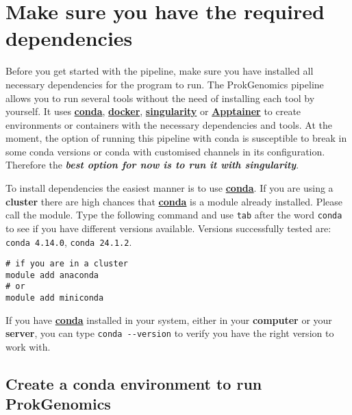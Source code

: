 \documentclass[
]{book}
\begin{document}
\hypertarget{make-sure-you-have-the-required-dependencies}{%
\section{Make sure you have the required dependencies}\label{make-sure-you-have-the-required-dependencies}}

Before you get started with the pipeline, make sure you have installed all necessary dependencies for the program to run. The ProkGenomics pipeline allows you to run several tools without the need of installing each tool by yourself. It uses \textbf{\href{https://conda.io/projects/conda/en/latest/user-guide/getting-started.html}{conda}}, \textbf{\href{https://www.docker.com/}{docker}}, \textbf{\href{https://docs.sylabs.io/guides/3.5/user-guide/introduction.html}{singularity}} or \textbf{\href{https://apptainer.org/get-started/}{Apptainer}} to create environments or containers with the necessary dependencies and tools. At the moment, the option of running this pipeline with conda is susceptible to break in some conda versions or conda with customised channels in its configuration. Therefore the \textbf{\emph{best option for now is to run it with singularity}}.

To install dependencies the easiest manner is to use \textbf{\href{https://conda.io/projects/conda/en/latest/user-guide/getting-started.html}{conda}}. If you are using a \textbf{cluster} there are high chances that \textbf{\href{https://conda.io/projects/conda/en/latest/user-guide/getting-started.html}{conda}} is a module already installed. Please call the module. Type the following command and use \texttt{tab} after the word \texttt{conda} to see if you have different versions available. Versions successfully tested are: \texttt{conda\ 4.14.0}, \texttt{conda\ 24.1.2}.

\begin{verbatim}
# if you are in a cluster
module add anaconda
# or
module add miniconda
\end{verbatim}

If you have \textbf{\href{https://conda.io/projects/conda/en/latest/user-guide/getting-started.html}{conda}} installed in your system, either in your \textbf{computer} or your \textbf{server}, you can type \texttt{conda\ -\/-version} to verify you have the right version to work with.

\hypertarget{create-a-conda-environment-to-run-prokgenomics}{%
\subsection{Create a conda environment to run ProkGenomics}\label{create-a-conda-environment-to-run-prokgenomics}}
\end{document}
